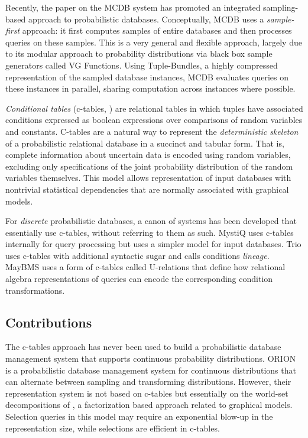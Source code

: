 Recently,  the paper  \cite{MCDB} on  the MCDB  system  has promoted an integrated  sampling-based  approach to  probabilistic databases.  Conceptually,  MCDB uses a {\em sample-first}\/ approach: it   first  computes  samples  of  entire databases and then processes queries  on these samples.  This is a very general and flexible approach, largely due to its modular approach to probability distributions via black box sample generators called VG Functions.  Using Tuple-Bundles, a highly compressed representation of the sampled database instances, MCDB evaluates queries on these instances in parallel, sharing computation across instances where possible.  

{\em  Conditional tables}\/  (c-tables, \cite{IL1984})  are relational tables in which tuples have associated conditions expressed as boolean expressions over  comparisons of random variables  and constants. C-tables are a natural way to  represent  the  {\em  deterministic skeleton}\/  of a probabilistic relational  database in  a succinct  and tabular  form.  That  is, complete information  about uncertain data is encoded using random  variables, excluding only  specifications  of the  joint  probability  distribution of  the random  variables   themselves.   This  model   allows  representation of  input databases  with  nontrivial statistical  dependencies that are normally associated with graphical models. 

For {\em discrete} probabilistic  databases, a canon of systems has been developed that essentially use c-tables, without referring to them as such. MystiQ  \cite{dalvi07efficient}  uses  c-tables internally  for  query processing  but  uses  a  simpler  model for  input  databases.   Trio \cite{WidomTrio2008}  uses  c-tables with  additional  syntactic sugar  and calls conditions {\em lineage}\/.  MayBMS \cite{AJKO2008}  uses a  form of  c-tables called  U-relations that define how relational algebra representations of queries can encode the corresponding condition transformations.

\subsection{Contributions}

The  c-tables  approach has  never  been used  to build  a
probabilistic  database  management  system that  supports  continuous
probability  distributions.
%
ORION \cite{ORION} is a probabilistic database management system for
continuous distributions that can alternate between sampling
and transforming distributions. However, their representation
system is not based on c-tables but essentially on the
world-set decompositions of \cite{AKO07WSD}, a factorization
based approach related to graphical models.
Selection queries in this model may require an exponential blow-up in the
representation size, while selections are efficient in c-tables.


